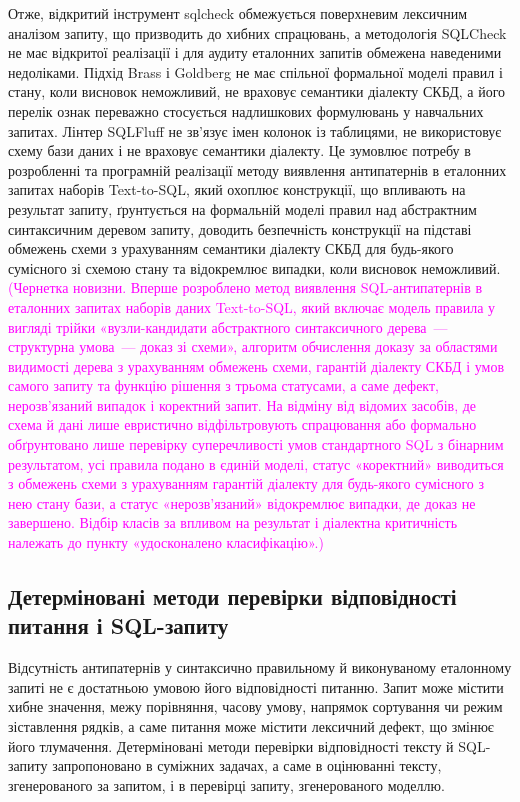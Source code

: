 \documentclass[a4paper,14pt,oneside]{extreport}
\begin{document}
Отже, відкритий інструмент sqlcheck обмежується поверхневим лексичним аналізом запиту, що призводить до хибних спрацювань, а методологія SQLCheck не має відкритої реалізації і для аудиту еталонних запитів обмежена наведеними недоліками. Підхід Brass і Goldberg не має спільної формальної моделі правил і стану, коли висновок неможливий, не враховує семантики діалекту СКБД, а його перелік ознак переважно стосується надлишкових формулювань у навчальних запитах. Лінтер SQLFluff не зв'язує імен колонок із таблицями, не використовує схему бази даних і не враховує семантики діалекту. Це зумовлює потребу в розробленні та програмній реалізації методу виявлення антипатернів в еталонних запитах наборів Text-to-SQL, який охоплює конструкції, що впливають на результат запиту, ґрунтується на формальній моделі правил над абстрактним синтаксичним деревом запиту, доводить безпечність конструкції на підставі обмежень схеми з урахуванням семантики діалекту СКБД для будь-якого сумісного зі схемою стану та відокремлює випадки, коли висновок неможливий. \textcolor{magenta}{(Чернетка новизни. Вперше розроблено метод виявлення SQL-антипатернів в еталонних запитах наборів даних Text-to-SQL, який включає модель правила у вигляді трійки «вузли-кандидати абстрактного синтаксичного дерева~--- структурна умова~--- доказ зі схеми», алгоритм обчислення доказу за областями видимості дерева з урахуванням обмежень схеми, гарантій діалекту СКБД і умов самого запиту та функцію рішення з трьома статусами, а саме дефект, нерозв'язаний випадок і коректний запит. На відміну від відомих засобів, де схема й дані лише евристично відфільтровують спрацювання або формально обґрунтовано лише перевірку суперечливості умов стандартного SQL з бінарним результатом, усі правила подано в єдиній моделі, статус «коректний» виводиться з обмежень схеми з урахуванням гарантій діалекту для будь-якого сумісного з нею стану бази, а статус «нерозв'язаний» відокремлює випадки, де доказ не завершено. Відбір класів за впливом на результат і діалектна критичність належать до пункту «удосконалено класифікацію».)}

\subsection{Детерміновані методи перевірки відповідності питання і SQL-запиту}
\label{subsec:question-sql}

Відсутність антипатернів у синтаксично правильному й виконуваному еталонному запиті не є достатньою умовою його відповідності питанню. Запит може містити хибне значення, межу порівняння, часову умову, напрямок сортування чи режим зіставлення рядків, а саме питання може містити лексичний дефект, що змінює його тлумачення. Детерміновані методи перевірки відповідності тексту й SQL-запиту запропоновано в суміжних задачах, а саме в оцінюванні тексту, згенерованого за запитом, і в перевірці запиту, згенерованого моделлю.
\end{document}
